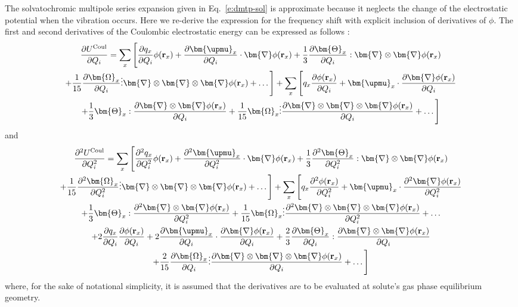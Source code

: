 \documentclass[b5paper,oneside,fleqn,11pt]{book}
\newcommand{\BM}[1]{\bm{#1}}
\newcommand{\fderiv}[2]{\ensuremath{
    \frac{\partial #1}{\partial #2}}}
\newcommand{\sderiv}[2]{\ensuremath{
    \frac{\partial^2 #1}{\partial #2^2}
    }}
\begin{document}
\begin{refsection}
The solvatochromic multipole series expansion given in Eq.~\eqref{e:dmtp-sol}
is approximate because it neglects the change of the electrostatic
potential when the vibration occurs. Here we re\hyp{}derive the 
expression for the frequency shift with explicit inclusion of derivatives
of $\phi$. The first and second derivatives of the Coulombic
electrostatic energy can be expressed as follows \citep{Blasiak.Cho.JCP.2014}:
%
\begin{multline} \label{x:726439}
 \fderiv{U^{\rm Coul}}{Q_i} =
%
\sum_x 
\Bigg[ 
  \fderiv{q_x}{Q_i} \phi({\bf r}_x) + 
  \fderiv{{\BM \upmu}_x}{Q_i} \cdot {\BM \nabla} \phi({\bf r}_x) + \frac{1}{3}  
  \fderiv{{\BM \Theta}_x}{Q_i} : {\BM \nabla}\otimes{\BM \nabla} \phi({\bf r}_x) \\ + \frac{1}{15}   
  \fderiv{{\BM \Omega}_x}{Q_i} \vdots {\BM \nabla}\otimes{\BM \nabla}\otimes{\BM \nabla} \phi({\bf r}_x) + \ldots 
\Bigg] 
%
+
%
\sum_x 
\Bigg[ 
  q_x \fderiv{\phi({\bf r}_x)}{Q_i} + 
  {\BM \upmu}_x \cdot \fderiv{{\BM \nabla} \phi({\bf r}_x)}{Q_i} \\ + \frac{1}{3} 
  {\BM \Theta}_x : \fderiv{{\BM \nabla}\otimes{\BM \nabla} \phi({\bf r}_x)}{Q_i} + \frac{1}{15}
  {\BM \Omega}_x \vdots \fderiv{{\BM \nabla}\otimes{\BM \nabla}\otimes{\BM \nabla} \phi({\bf r}_x)}{Q_i} + \ldots 
\Bigg]
\end{multline}
%
and
%
\begin{multline} \label{x:726440}
 \sderiv{U^{\rm Coul}}{Q_i} =
%
\sum_x 
\Bigg[ 
  \sderiv{q_x}{Q_i} \phi({\bf r}_x) + 
  \sderiv{{\BM \upmu}_x}{Q_i} \cdot {\BM \nabla} \phi({\bf r}_x) + \frac{1}{3}  
  \sderiv{{\BM \Theta}_x}{Q_i} : {\BM \nabla}\otimes{\BM \nabla} \phi({\bf r}_x) \\ + \frac{1}{15}   
  \sderiv{{\BM \Omega}_x}{Q_i} \vdots {\BM \nabla}\otimes{\BM \nabla}\otimes{\BM \nabla} \phi({\bf r}_x) + \ldots 
\Bigg] 
%
+
%
\sum_x 
\Bigg[ 
  q_x \sderiv{\phi({\bf r}_x)}{Q_i} + 
  {\BM \upmu}_x \cdot \sderiv{{\BM \nabla} \phi({\bf r}_x)}{Q_i} \\ + \frac{1}{3} 
  {\BM \Theta}_x : \sderiv{{\BM \nabla}\otimes{\BM \nabla} \phi({\bf r}_x)}{Q_i} + \frac{1}{15}
  {\BM \Omega}_x \vdots \sderiv{{\BM \nabla}\otimes{\BM \nabla}\otimes{\BM \nabla} \phi({\bf r}_x)}{Q_i} + \ldots
\\
%
+2\fderiv{q_x}{Q_i} \fderiv{\phi({\bf r}_x)}{Q_i} 
+2\fderiv{{\BM \upmu}_x}{Q_i} \cdot \fderiv{{\BM \nabla} \phi({\bf r}_x)}{Q_i}
+ \frac{2}{3}  
  \fderiv{{\BM \Theta}_x}{Q_i} : \fderiv{{\BM \nabla}\otimes{\BM \nabla} \phi({\bf r}_x)}{Q_i} \\
+ \frac{2}{15}   
  \fderiv{{\BM \Omega}_x}{Q_i} \vdots \fderiv{{\BM \nabla}\otimes{\BM \nabla}\otimes{\BM \nabla} \phi({\bf r}_x)}{Q_i}
+ \ldots
\Bigg]
\end{multline}
%
where, for the sake of notational simplicity, 
it is assumed that the derivatives are to be evaluated at
solute's gas phase equilibrium geometry.


\end{refsection}
\end{document}
